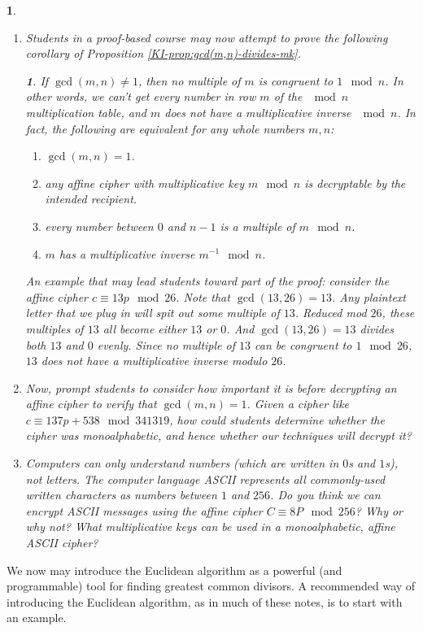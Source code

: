 \documentclass[11pt]{article}
\theoremstyle{plain}
\theoremstyle{remark}
\theoremstyle{definition}
\theoremstyle{definition}
\theoremstyle{definition}
\theoremstyle{plain}
\newtheorem{cor}[thm]{\protect\corollaryname}
\theoremstyle{plain}
\theoremstyle{plain}
\newtheorem{act}[thm]{\protect\activityname}
\theoremstyle{definition}
\providecommand{\corollaryname}{Corollary}
\providecommand{\activityname}{Activity}
\begin{document}
\begin{act}
\begin{enumerate}
\item Students in a proof-based course may now attempt to prove the following
corollary of Proposition \ref{KI-prop:gcd(m,n)-divides-mk}.
\begin{cor}
If $\gcd(m,n)\neq1$, then no multiple of $m$ is congruent to $1\mod n$.
In other words, we can't get every number in row $m$ of the $\mod n$
multiplication table, and \textit{$m$ }does not have a multiplicative
inverse\textit{ $\mod n$.} In fact, the following are equivalent
for any whole numbers $m,n$:
\begin{enumerate}
\item $\gcd(m,n)=1$.
\item any affine cipher with multiplicative key $m\mod n$ is decryptable
by the intended recipient.
\item every number between $0$ and $n-1$ is a multiple of $m\mod n$.
\item $m$ has a multiplicative inverse $m^{-1}\mod n$.
\end{enumerate}
\end{cor}

An example that may lead students toward part of the proof: consider
the affine cipher $c\equiv13p\mod26$. Note that $\gcd(13,26)=13$.
Any plaintext letter that we plug in will spit out some multiple of
$13$. Reduced mod $26$, these multiples of $13$ all become either
$13$ or $0$. And $\gcd(13,26)=13$ divides both $13$ and $0$ evenly.
Since no multiple of $13$ can be congruent to $1\mod26$, $13$ does
not have a multiplicative inverse modulo $26$.

\item Now, prompt students to consider how important it is before decrypting
an affine cipher to verify that $\gcd(m,n)=1$. Given a cipher like
$c\equiv137p+538\mod341319$, how could students determine whether
the cipher was monoalphabetic, and hence whether our techniques will
decrypt it? 

\item Computers can only understand numbers (which are written in $0$s and $1$s), not letters. The computer language ASCII represents all commonly-used written characters as numbers between $1$ and $256$. Do you think we can encrypt ASCII messages using the affine cipher $C\equiv8P\mod256$? Why or why not? What multiplicative keys can be used in a monoalphabetic, affine ASCII cipher?
\end{enumerate}
\end{act}

We now may introduce the Euclidean algorithm as a powerful
(and programmable) tool for finding greatest common divisors. A recommended way of introducing the Euclidean algorithm, as in much
of these notes, is to start with an example. 
\end{document}
